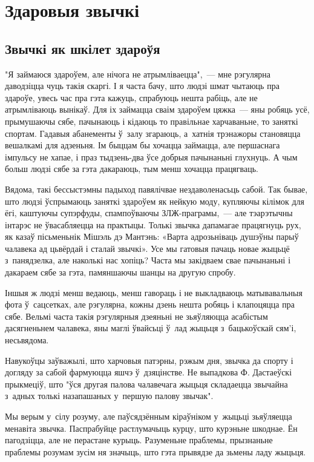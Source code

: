 \chapter{Здаровыя звычкі}

\section{Звычкі як шкілет здароўя}

"Я займаюся здароўем, але нічога не атрымліваецца",~--- мне рэгулярна даводзіцца чуць такія скаргі. І я часта бачу, што людзі шмат чытаюць пра здароўе, увесь час пра гэта кажуць, спрабуюць нешта рабіць, але не атрымліваюць вынікаў. Для іх займацца сваім здароўем цяжка~--- яны робяць усё, прымушаючы сябе, пачынаюць і кідаюць то правільнае харчаваньне, то заняткі спортам. Гадавыя абанементы ў~залу згараюць, а~хатнія трэнажоры становяцца вешалкамі для адзеньня. Ім быццам бы хочацца займацца, але першаснага імпульсу не хапае, і праз тыдзень-два ўсе добрыя пачынаньні глухнуць. А чым больш людзі сябе за гэта дакараюць, тым менш хочацца працягваць.

Вядома, такі бессыстэмны падыход павялічвае нездаволенасьць сабой. Так бывае, што людзі ўспрымаюць заняткі здароўем як нейкую моду, купляючы кілімок для ёгі, каштуючы супэрфуды, спампоўваючы ЗЛЖ-праграмы,~--- але тэарэтычны інтарэс не ўвасабляецца на практыцы. Толькі звычка дапамагае працягнуць рух, як казаў пісьменьнік Мішэль дэ Мантэнь: «Варта адрозьніваць душэўны парыў чалавека ад цьвёрдай і сталай звычкі». Усе мы гатовыя пачаць новае жыцьцё з~панядзелка, але наколькі нас хопіць? Часта мы закідваем свае пачынаньні і дакараем сябе за гэта, памяншаючы шанцы на другую спробу.

Іншыя ж людзі менш ведаюць, менш гавораць і не выкладваюць матывавальныя фота ў~сацсетках, але рэгулярна, кожны дзень нешта робяць і клапоцяцца пра сябе. Вельмі часта такія рэгулярныя дзеяньні не зьяўляюцца асабістым дасягненьнем чалавека, яны маглі ўвайсьці ў~лад жыцьця з~бацькоўскай сям'і, несьвядома.

Навукоўцы заўважылі, што харчовыя патэрны, рэжым дня, звычка да спорту і догляду за сабой фармуюцца яшчэ ў~дзяцінстве. Не выпадкова Ф. Дастаеўскі прыкмеціў, што "ўся другая палова чалавечага жыцьця складаецца звычайна з~адных толькі назапашаных у~першую палову звычак".

Мы верым у~сілу розуму, але паўсядзённым кіраўніком у~жыцьці зьяўляецца менавіта звычка. Паспрабуйце растлумачыць курцу, што курэньне шкоднае. Ён пагодзіцца, але не перастане курыць. Разуменьне праблемы, прызнаньне праблемы розумам зусім ня значыць, што гэта прывядзе да зьмены ладу жыцьця.

